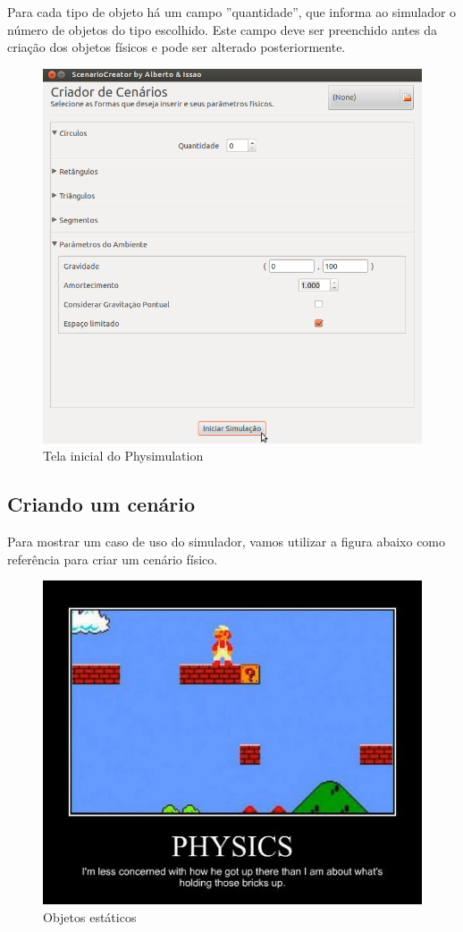 Para cada tipo de objeto há um campo ''quantidade'', que informa ao simulador o número de objetos do tipo escolhido. Este campo deve ser preenchido antes da criação dos objetos físicos e pode ser alterado posteriormente.

\begin{figure}[H]
	\centering
	\includegraphics[scale=0.4]{images/physimulation-2.png}
	\caption{Tela inicial do Physimulation}
\end{figure}

\subsection{Criando um cenário}
Para mostrar um caso de uso do simulador, vamos utilizar a figura abaixo como referência para criar um cenário físico.

\begin{figure}[H]
  \centering
  \includegraphics[scale=0.6]{images/bricks.jpg}
  \caption{Objetos estáticos \protect\cite{mario:physics}}
\end{figure}

